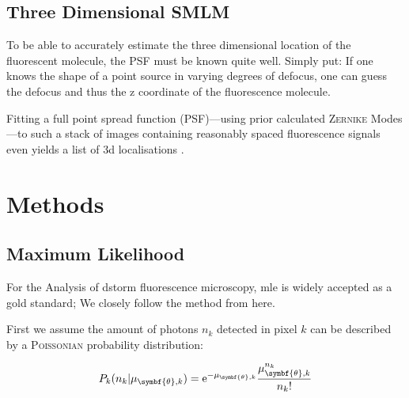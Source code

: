 \documentclass[11pt, a4paper, oneside, twocolumn]{report}
\renewcommand{\t}{\todo}
\newcommand{\n}{\textnormal}
\begin{document}
\section{Three Dimensional SMLM}

To be able to accurately estimate the three dimensional location of
the fluorescent molecule, the PSF must be known quite well. Simply
put: If one knows the shape of a point source in varying degrees of
defocus, one can guess the defocus and thus the z coordinate of the
fluorescence molecule.

Fitting a full point spread function (PSF)---using prior calculated
\textsc{Zernike} Modes---to such a stack of images containing reasonably spaced
fluorescence signals even yields a list of 3d localisations \t{ref}.


\clearpage\chapter{Methods}


\section{Maximum Likelihood}\label{s:m:mle}

For the Analysis of \gls{dstorm} fluorescence microscopy,
\gls{mle} is widely accepted as a
gold standard; We closely follow the method from \cite{zkr18} here.

First we assume the amount of photons $n_k$ detected in pixel $k$ can
be described by a \textsc{Poissonian} probability
distribution:

\begin{equation}
  P_k(n_k | \mu_{\symbf{\theta},k}) = \n{e}^{-\mu_{\symbf{\theta},k}} \frac{\mu_{\symbf{\theta},k}^{n_k}}{n_k!}
\end{equation}
\end{document}
